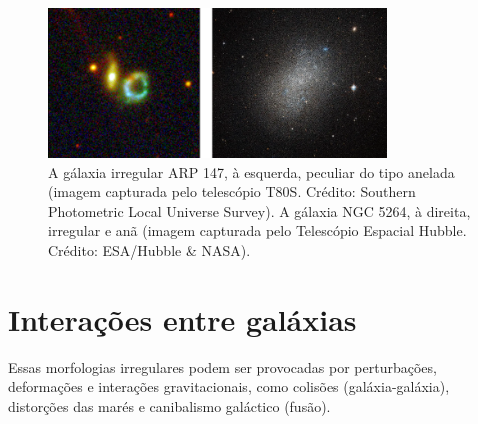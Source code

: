 \begin{figure}[h] 
  \centering 
  \includegraphics[width=0.8\textwidth]{Imagens/irregulares.png} 
  \caption[Gálaxia ARP 147 e gálaxia NGC 5264.]{A gálaxia irregular ARP 147, à esquerda, peculiar do tipo anelada (imagem capturada pelo telescópio T80S. Crédito: Southern Photometric Local Universe Survey). A gálaxia NGC 5264, à direita, irregular e anã (imagem capturada pelo Telescópio Espacial Hubble. Crédito: ESA/Hubble \& NASA).}
  \label{fig:irregulares} 
\end{figure}

\section{Interações entre galáxias}

Essas morfologias irregulares podem ser provocadas por perturbações, deformações e interações gravitacionais, como colisões (galáxia-galáxia), distorções das marés e canibalismo galáctico (fusão).


